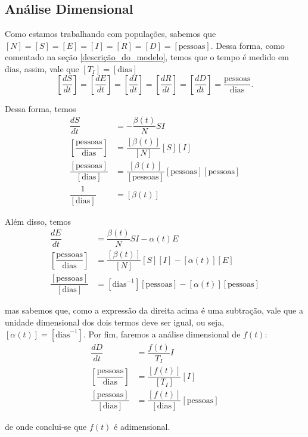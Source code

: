 \documentclass{article}
\begin{document}
\subsection{Análise Dimensional} \label{analise_dimensional}

Como estamos trabalhando com populações, sabemos que $[N] = [S] = [E] = [I] = [R] = [D] = [\text{pessoas}]$. Dessa forma, como comentado na seção \ref{descrição_do_modelo}, temos que o tempo é medido em dias, assim, vale que $[T_I] = [\text{dias}]$
\[\left[\dfrac{dS}{dt}\right] = \left[\dfrac{dE}{dt}\right] = \left[\dfrac{dI}{dt}\right] = \left[\dfrac{dR}{dt}\right] = \left[\dfrac{dD}{dt}\right] = \dfrac{\text{pessoas}}{\text{dias}}.\]

Dessa forma, temos
\begin{equation*}
    \begin{split}
        \dfrac{dS}{dt} & = -\dfrac{\beta(t)}{N}SI \\
        \left[\dfrac{\text{pessoas}}{\text{dias}}\right] & = \dfrac{[\beta(t)]}{[N]}[S][I] \\
        \dfrac{[\text{pessoas}]}{[\text{dias}]} & = \dfrac{[\beta(t)]}{[\text{pessoas}]}[\text{pessoas}][\text{pessoas}] \\
        \dfrac{1}{[\text{dias}]} & = [\beta(t)]
    \end{split}
\end{equation*}

Além disso, temos
\begin{equation*}
    \begin{split}
        \dfrac{dE}{dt} & = \dfrac{\beta(t)}{N}SI - \alpha(t) E \\
        \left[\dfrac{\text{pessoas}}{\text{dias}}\right] & = \dfrac{[\beta(t)]}{[N]}[S][I] - [\alpha(t)][E] \\
        \dfrac{[\text{pessoas}]}{[\text{dias}]} & = [\text{dias}^{-1}][\text{pessoas}] - [\alpha(t)][\text{pessoas}]
    \end{split}
\end{equation*}

\noindent mas sabemos que, como a expressão da direita acima é uma subtração, vale que a unidade dimensional dos dois termos deve ser igual, ou seja, $[\alpha(t)] = [\text{dias}^{-1}]$. Por fim, faremos a análise dimensional de $f(t)$:
\begin{equation*}
    \begin{split}
        \dfrac{dD}{dt} & = \dfrac{f(t)}{T_I}I \\
        \left[\dfrac{\text{pessoas}}{\text{dias}}\right] & = \dfrac{[f(t)]}{[T_I]}[I] \\
        \dfrac{[\text{pessoas}]}{[\text{dias}]} & = \dfrac{[f(t)]}{[\text{dias}]}[\text{pessoas}]
    \end{split}
\end{equation*}

\noindent de onde conclui-se que $f(t)$ é adimensional.

\printbibliography
\end{document}
